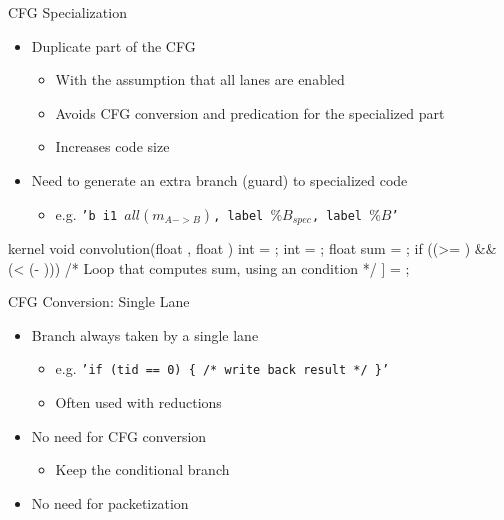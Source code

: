 
\begin{frame}[fragile]{CFG Specialization}

\begin{itemize}
    \item Duplicate part of the CFG
    \begin{itemize}
        \item With the assumption that all lanes are enabled
        \item Avoids CFG conversion and predication for the specialized part
        \item Increases code size
    \end{itemize}
    \item Need to generate an extra branch (guard) to specialized code
    \begin{itemize}
        \item e.g. \texttt{'b i1 $all(m_{A->B})$, label $\%B_{spec}$, label $\%B$'}
    \end{itemize}
\end{itemize}

\begin{codebox}[commandchars=\\\[\]]
kernel void convolution(float \uniform[*src], float \uniform[*dst]) {
  int \varying[x] = ;
  int \uniform[width] = ;
  float sum = \uniform[0.0f];
  if ((\varying[x] >= ) && (\varying[x] < (\uniform[width] - ))) {
    /* Loop that computes sum, using an \uniform[uniform] condition */
  }
  \uniform[dst]\idx[\varying[x]] = \varying[sum];
}
\end{codebox}

\end{frame}


\begin{frame}{CFG Conversion: Single Lane}

\begin{itemize}
    \item Branch always taken by a single lane
    \begin{itemize}
        \item e.g. \texttt{'if (tid == 0) \{ /* write back result */ \}'}
        \item Often used with reductions
    \end{itemize}
    \item No need for CFG conversion
    \begin{itemize}
        \item Keep the conditional branch
    \end{itemize}
    \item No need for packetization
\end{itemize}

\end{frame}

